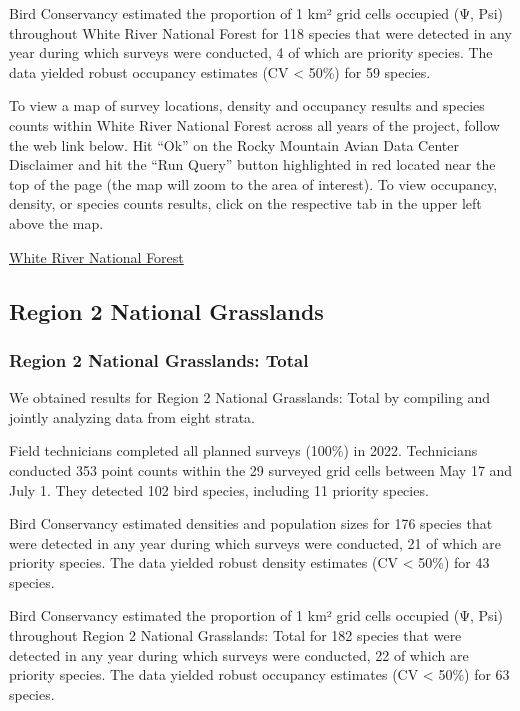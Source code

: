 \documentclass[
  letterpaper,
  DIV=11,
  numbers=noendperiod,
  oneside]{scrreprt}
\begin{document}
Bird Conservancy estimated the proportion of 1 km² grid cells occupied
(Ψ, Psi) throughout White River National Forest for 118 species that
were detected in any year during which surveys were conducted, 4 of
which are priority species. The data yielded robust occupancy estimates
(CV \textless{} 50\%) for 59 species.

To view a map of survey locations, density and occupancy results and
species counts within White River National Forest across all years of
the project, follow the web link below. Hit ``Ok'' on the Rocky Mountain
Avian Data Center Disclaimer and hit the ``Run Query'' button
highlighted in red located near the top of the page (the map will zoom
to the area of interest). To view occupancy, density, or species counts
results, click on the respective tab in the upper left above the map.

\href{http://www.rmbo.org/new_site/adc/QueryWindow.aspx\#N4IgzgrgDgpgTmALnAhoiBbEAuABCAdQAsBLRGXAJRIDd5cA5NEgewDsUAbXAMRbhhIQAXyA}{White
River National Forest}

\hypertarget{region-2-national-grasslands}{%
\subsection{Region 2 National
Grasslands}\label{region-2-national-grasslands}}

\hypertarget{region-2-national-grasslands-total}{%
\subsubsection{Region 2 National Grasslands:
Total}\label{region-2-national-grasslands-total}}

We obtained results for Region 2 National Grasslands: Total by compiling
and jointly analyzing data from eight strata.

Field technicians completed all planned surveys (100\%) in 2022.
Technicians conducted 353 point counts within the 29 surveyed grid cells
between May 17 and July 1. They detected 102 bird species, including 11
priority species.

Bird Conservancy estimated densities and population sizes for 176
species that were detected in any year during which surveys were
conducted, 21 of which are priority species. The data yielded robust
density estimates (CV \textless{} 50\%) for 43 species.

Bird Conservancy estimated the proportion of 1 km² grid cells occupied
(Ψ, Psi) throughout Region 2 National Grasslands: Total for 182 species
that were detected in any year during which surveys were conducted, 22
of which are priority species. The data yielded robust occupancy
estimates (CV \textless{} 50\%) for 63 species.
\end{document}
